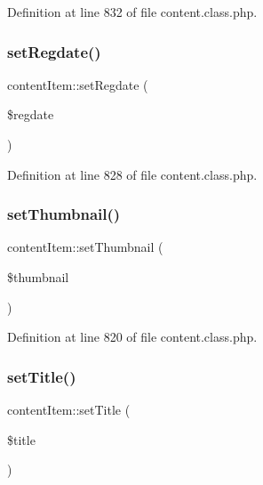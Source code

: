 Definition at line 832 of file content.\+class.\+php.

\mbox{\label{classcontentItem_abb2dad632dd405213708d5c211518c82}} 
\subsubsection{\texorpdfstring{set\+Regdate()}{setRegdate()}}
{\footnotesize\ttfamily content\+Item\+::set\+Regdate (\begin{DoxyParamCaption}\item[{}]{\$regdate }\end{DoxyParamCaption})}



Definition at line 828 of file content.\+class.\+php.

\mbox{\label{classcontentItem_a0145a758535658fa776871bfd675be15}} 
\subsubsection{\texorpdfstring{set\+Thumbnail()}{setThumbnail()}}
{\footnotesize\ttfamily content\+Item\+::set\+Thumbnail (\begin{DoxyParamCaption}\item[{}]{\$thumbnail }\end{DoxyParamCaption})}



Definition at line 820 of file content.\+class.\+php.

\mbox{\label{classcontentItem_a5a29426d7878c413cd6d63e930ce0a0f}} 
\subsubsection{\texorpdfstring{set\+Title()}{setTitle()}}
{\footnotesize\ttfamily content\+Item\+::set\+Title (\begin{DoxyParamCaption}\item[{}]{\$title }\end{DoxyParamCaption})}



